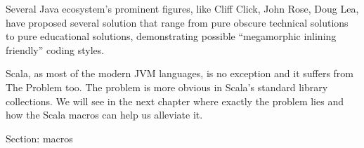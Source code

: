 Several Java ecosystem's prominent figures, like Cliff Click, John Rose, Doug
Lea, have proposed several solution that range from pure obscure technical
solutions to pure educational solutions, demonstrating possible ``megamorphic
inlining friendly'' coding styles.

Scala, as most of the modern JVM languages, is no exception and it suffers from
The Problem too. The problem is more obvious in Scala's standard library
collections. We will see in the next chapter where exactly the problem lies
and how the Scala macros can help us alleviate it.


Section: macros
